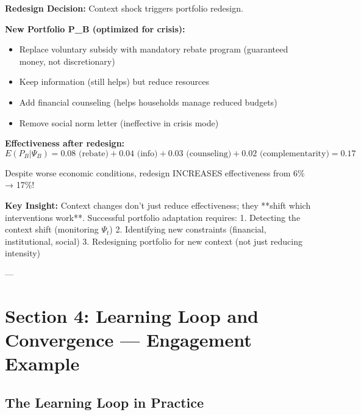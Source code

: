 \textbf{Redesign Decision:} Context shock triggers portfolio redesign.

\textbf{New Portfolio P_B (optimized for crisis):}
\begin{itemize}[nosep]
\item Replace voluntary subsidy with mandatory rebate program (guaranteed money, not discretionary)
\item Keep information (still helps) but reduce resources
\item Add financial counseling (helps households manage reduced budgets)
\item Remove social norm letter (ineffective in crisis mode)
\end{itemize}

\textbf{Effectiveness after redesign:}
\begin{equation}
E(P_B | \Psi_B) = 0.08 \text{ (rebate)} + 0.04 \text{ (info)} + 0.03 \text{ (counseling)} + 0.02 \text{ (complementarity)} = 0.17
\label{eq:21-energia-redesign}
\end{equation}

Despite worse economic conditions, redesign INCREASES effectiveness from 6\% → 17\%!

\textbf{Key Insight:} Context changes don't just reduce effectiveness; they **shift which interventions work**. Successful portfolio adaptation requires:
1. Detecting the context shift (monitoring $\Psi_t$)
2. Identifying new constraints (financial, institutional, social)
3. Redesigning portfolio for new context (not just reducing intensity)

---

\section{Section 4: Learning Loop and Convergence — Engagement Example}
\label{sec:21-convergence}

\subsection{The Learning Loop in Practice}

\begin{center}
\end{center}

